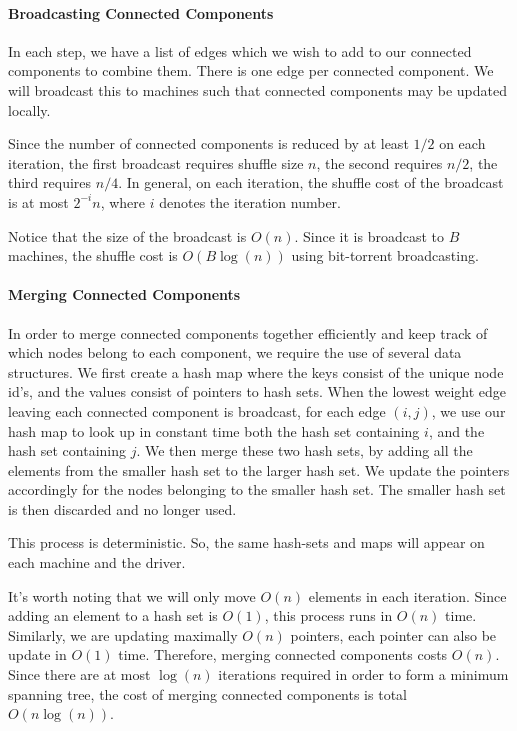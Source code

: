 \documentclass{article}
\begin{document}
\paragraph{Broadcasting Connected Components}
In each step, we have a list of edges which we wish to add to our connected components to combine them. There is one edge per connected component. We will broadcast this to machines such that connected components may be updated locally.

Since the number of connected components is reduced by at least $1/2$ on each iteration, the first broadcast requires shuffle size $n$, the second requires $n/2$, the third requires $n/4$. In general, on each iteration, the shuffle cost of the broadcast is at most $2^{-i}n$, where $i$ denotes the iteration number.

Notice that the size of the broadcast is $O(n)$. Since it is broadcast to $B$ machines, the shuffle cost is $O(B\log(n))$ using bit-torrent broadcasting.

\paragraph{Merging Connected Components} 

In order to merge connected components together efficiently and keep track of which nodes belong to each component, we require the use of several data structures. We first create a hash map where the keys consist of the unique node id's, and the values consist of pointers to hash sets. When the lowest weight edge leaving each connected component is broadcast, for each edge $(i,j)$, we use our hash map to look up in constant time both the hash set containing $i$, and the hash set containing $j$. We then merge these two hash sets, by adding all the elements from the smaller hash set to the larger hash set. We update the pointers accordingly for the nodes belonging to the smaller hash set. The smaller hash set is then discarded and no longer used.

This process is deterministic. So, the same hash-sets and maps will appear on each machine and the driver.

It's worth noting that we will only move $O(n)$ elements in each iteration. Since adding an element to a hash set is $O(1)$, this process runs in $O(n)$ time. Similarly, we are updating maximally $O(n)$ pointers, each pointer can also be update in $O(1)$ time. Therefore, merging connected components costs $O(n)$. Since there are at most $\log(n)$ iterations required in order to form a minimum spanning tree, the cost of merging connected components is total $O(n \log(n))$.
\end{document}
